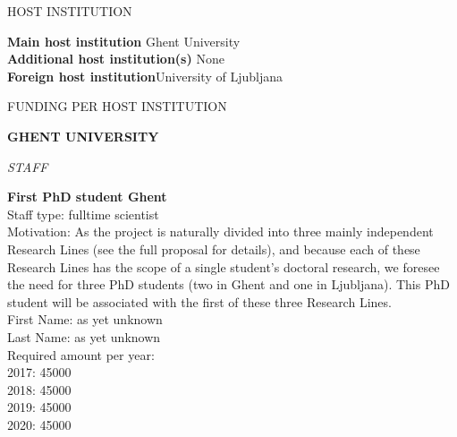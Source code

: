 \documentclass[11pt,dvipsnames,usenames,a4paper]{article}
\begin{document}
\vspace{10pt}

\begin{shaded}\centering HOST INSTITUTION \end{shaded}
\textbf{Main host institution} \tab Ghent University \\
\textbf{Additional host institution(s)} \tab None\\
\textbf{Foreign host institution}\tab University of Ljubljana \\

\begin{shaded}\centering FUNDING PER HOST INSTITUTION \end{shaded}










{\bf GHENT UNIVERSITY}

{\it STAFF}

{\bf First PhD student Ghent}\\
Staff type: fulltime scientist\\
Motivation: As the project is naturally divided into three mainly independent Research Lines (see the full proposal for details), and because each of these Research Lines has the scope of a single student's doctoral research, we foresee the need for three PhD students (two in Ghent and one in Ljubljana). This PhD student will be associated with the first of these three Research Lines. \\
First Name: as yet unknown\\
Last Name: as yet unknown\\
Required amount per year:\\
2017: 45000\\
2018: 45000\\
2019: 45000\\
2020: 45000
\end{document}
